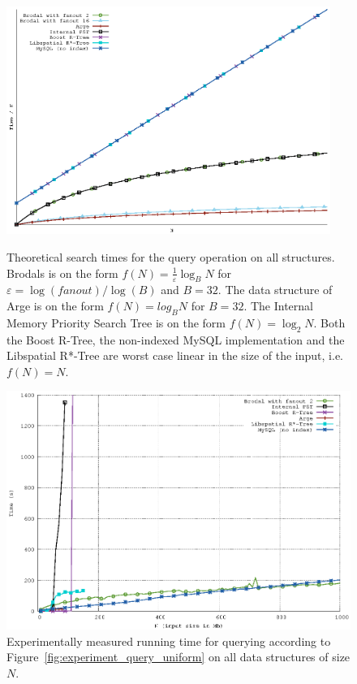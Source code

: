 \documentclass[twoside,11pt,openright]{report}
\def \epsilon {\varepsilon}
\begin{document}
\begin{figure}[H]
\centering
\includegraphics[width=0.94\textwidth]{../plots/query_complexities/query_complexity}
\caption{Theoretical search times for the query operation on all structures. Brodals is on the form $f(N) = \frac{1}{\epsilon}\log_B N$ for $\epsilon = \log(fanout) / \log(B)$ and $B = 32$. The data structure of Arge is on the form $f(N) = log_B N$ for $B = 32$. The Internal Memory Priority Search Tree is on the form $f(N) = \log_2 N$. Both the Boost R-Tree, the non-indexed MySQL implementation and the Libspatial R*-Tree are worst case linear in the size of the input, i.e. $f(N) = N$.}
\label{fig:theory_query_complexity}
\includegraphics[width=\textwidth]{../src/experiments/query_experiment_results/final2/time}
\caption{Experimentally measured running time for querying according to Figure~\ref{fig:experiment_query_uniform} on all data structures of size $N$.}
\label{fig:result_query_search_complexity}
\end{figure}
\end{document}
